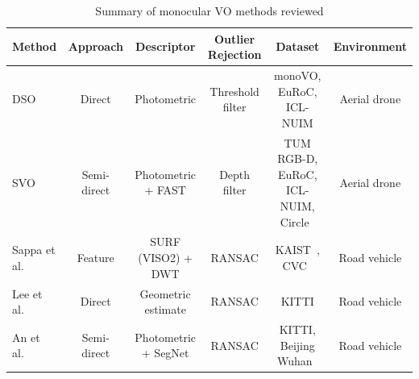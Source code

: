  \begin{table}
 	\caption{Summary of monocular VO methods reviewed}\label{tablemono}
 	\centering
 	\footnotesize
 	\begin{tabularx}{\textwidth}{X c c c c c}
 		\toprule
 		\bfseries Method & \bfseries Approach & \bfseries Descriptor & \bfseries Outlier Rejection & \bfseries Dataset & \bfseries Environment \\
 		\midrule
 		DSO~\cite{engel_direct_2018} & Direct & Photometric & Threshold filter & monoVO, EuRoC, ICL-NUIM & Aerial drone \\
 		SVO~\cite{forster_svo:_2017} & Semi-direct & Photometric + FAST & Depth filter & TUM RGB-D, EuRoC, ICL-NUIM, Circle~\cite{forster_svo:_2017} & Aerial drone \\
 		Sappa et al.~\cite{sappa_monocular_2016} & Feature & SURF (VISO2) + DWT & RANSAC & KAIST~\cite{choi_kaist_2018}, CVC~\cite{poujol_visible-thermal_2016} & Road vehicle \\
 		Lee et al.~\cite{lee_online_2015} & Direct & Geometric estimate & RANSAC & KITTI & Road vehicle \\
 		An et al.~\cite{an_semantic_2017} & Semi-direct & Photometric + SegNet & RANSAC & KITTI, Beijing Wuhan~\cite{an_semantic_2017} & Road vehicle\\
 		\bottomrule
 	\end{tabularx}


\end{table}
